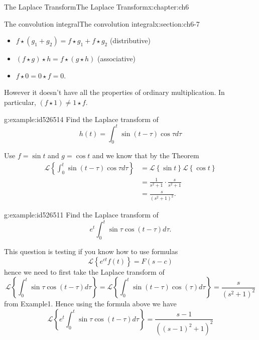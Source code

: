\documentclass[oneside,10pt,]{book}
\numberwithin{equation}{section}
\numberwithin{equation}{section}
\newcommand{\amp}{&}
\begin{document}
\begin{chapterptx}{The Laplace Transform}{}{The Laplace Transform}{}{}{x:chapter:ch6}
\begin{sectionptx}{The convolution integral}{}{The convolution integral}{}{}{x:section:ch6-7}
\begin{itemize}[label=\textbullet]
\item{}\(f\star\left(g_{1}+g_{2}\right)=f\star g_{1}+f\star g_{2}\) (distributive)%
\item{}\(\left(f\star g\right)\star h=f\star\left(g\star h\right)\) (associative)%
\item{}\(f\star0=0\star f=0\).%
\end{itemize}
However it doesn't have all the properties of ordinary multiplication. In particular, \(\left(f\star1\right)\neq1\star f\).%
\begin{example}{}{g:example:id526514}%
Find the Laplace transform of%
\begin{equation*}
h(t)=\int_{0}^{t}\sin\left(t-\tau\right)\cos\tau d\tau
\end{equation*}
%
\par
Use \(f=\sin t\) and \(g=\cos t\) and we know that by the Theorem%
\begin{align*}
\mathcal{L}\left\{ \int_{0}^{t}\sin\left(t-\tau\right)\cos\tau d\tau\right\}  \amp =\mathcal{L}\left\{ \sin t\right\} \mathcal{L}\left\{ \cos t\right\} \\
\amp =\frac{1}{s^{2}+1}\cdot\frac{s}{s^{2}+1}\\
\amp =\frac{s}{(s^{2}+1)^{2}}.
\end{align*}
%
\end{example}
\begin{example}{}{g:example:id526511}%
Find the Laplace transform of%
\begin{equation*}
e^{t}\int_{0}^{t}\sin\tau\cos\left(t-\tau\right)d\tau.
\end{equation*}
%
\par
This question is testing if you know how to use formulas%
\begin{equation*}
\mathcal{L}\left\{ e^{ct}f(t)\right\} =F(s-c)
\end{equation*}
hence we need to first take the Laplace transform of%
\begin{equation*}
\mathcal{L}\left\{ \int_{0}^{t}\sin\tau\cos\left(t-\tau\right)d\tau\right\} =\mathcal{L}\left\{ \int_{0}^{t}\sin\left(t-\tau\right)\cos\left(\tau\right)d\tau\right\} =\frac{s}{(s^{2}+1)^{2}}
\end{equation*}
from Example1. Hence using the formula above we have%
\begin{equation*}
\mathcal{L}\left\{ e^{t}\int_{0}^{t}\sin\tau\cos\left(t-\tau\right)d\tau\right\} =\frac{s-1}{\left(\left(s-1\right)^{2}+1\right)^{2}}
\end{equation*}
%
\end{example}

\end{sectionptx}
\end{chapterptx}
\end{document}
